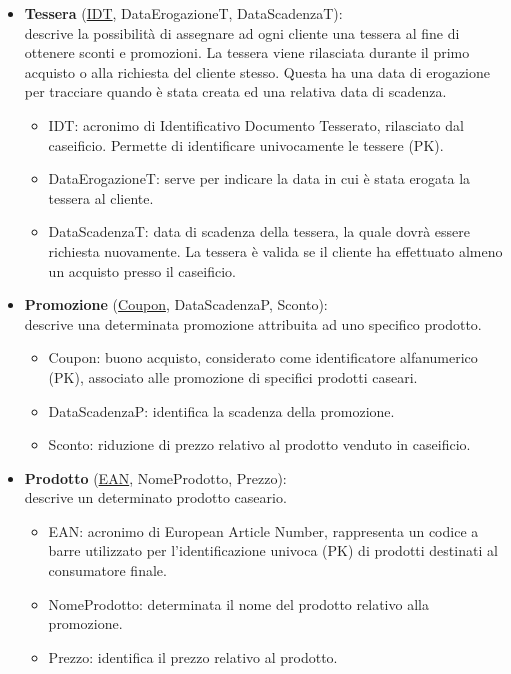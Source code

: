 \documentclass[12pt]{report}
\begin{document}
\begin{itemize}
\item \textbf{Tessera} (\underline{IDT}, DataErogazioneT, DataScadenzaT):\\
descrive la possibilità di assegnare ad ogni cliente una tessera al fine di ottenere sconti e promozioni. La tessera viene rilasciata durante il primo acquisto o alla richiesta del cliente stesso. Questa ha una data di erogazione per tracciare quando è stata creata ed una relativa data di scadenza.
\begin{itemize}
\item IDT: acronimo di Identificativo Documento Tesserato, rilasciato dal caseificio. Permette di identificare univocamente le tessere (PK). 
\item DataErogazioneT: serve per indicare la data in cui è stata erogata la tessera al cliente.
\item DataScadenzaT: data di scadenza della tessera, la quale dovrà essere richiesta nuovamente. La tessera è valida se il cliente ha effettuato almeno un acquisto presso il caseificio.
\end{itemize}
 

\item \textbf{Promozione} (\underline{Coupon}, DataScadenzaP, Sconto):\\
descrive una determinata promozione attribuita ad uno specifico prodotto. 
\begin{itemize}
\item Coupon: buono acquisto, considerato come identificatore alfanumerico (PK), associato alle promozione di specifici prodotti caseari.
\item DataScadenzaP: identifica la scadenza della promozione. 
\item Sconto: riduzione di prezzo relativo al prodotto venduto in caseificio. 
\end{itemize}

\item \textbf{Prodotto} (\underline{EAN}, NomeProdotto, Prezzo):\\
descrive un determinato prodotto caseario. 
\begin{itemize}
\item EAN: acronimo di European Article Number, rappresenta un codice a barre utilizzato per l'identificazione univoca (PK) di prodotti destinati al consumatore finale.
\item NomeProdotto: determinata il nome del prodotto relativo alla promozione. 
\item Prezzo: identifica il prezzo relativo al prodotto. 
\end{itemize}
 

\end{itemize}
\end{document}
